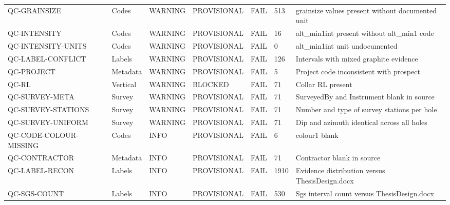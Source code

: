 \begin{table}[htbp]
\begin{tabular}{lllllll}
QC-GRAINSIZE & Codes & WARNING & PROVISIONAL & FAIL & 513 & grainsize values present without documented unit \\
QC-INTENSITY & Codes & WARNING & PROVISIONAL & FAIL & 16 & alt\_min1int present without alt\_min1 code \\
QC-INTENSITY-UNITS & Codes & WARNING & PROVISIONAL & FAIL & 0 & alt\_min1int unit undocumented \\
QC-LABEL-CONFLICT & Labels & WARNING & PROVISIONAL & FAIL & 126 & Intervals with mixed graphite evidence \\
QC-PROJECT & Metadata & WARNING & PROVISIONAL & FAIL & 5 & Project code inconsistent with prospect \\
QC-RL & Vertical & WARNING & BLOCKED & FAIL & 71 & Collar RL present \\
QC-SURVEY-META & Survey & WARNING & PROVISIONAL & FAIL & 71 & SurveyedBy and Instrument blank in source \\
QC-SURVEY-STATIONS & Survey & WARNING & PROVISIONAL & FAIL & 71 & Number and type of survey stations per hole \\
QC-SURVEY-UNIFORM & Survey & WARNING & PROVISIONAL & FAIL & 71 & Dip and azimuth identical across all holes \\
QC-CODE-COLOUR-MISSING & Codes & INFO & PROVISIONAL & FAIL & 6 & colour1 blank \\
QC-CONTRACTOR & Metadata & INFO & PROVISIONAL & FAIL & 71 & Contractor blank in source \\
QC-LABEL-RECON & Labels & INFO & PROVISIONAL & FAIL & 1910 & Evidence distribution versus ThesisDesign.docx \\
QC-SGS-COUNT & Labels & INFO & PROVISIONAL & FAIL & 530 & Sgs interval count versus ThesisDesign.docx \\
\bottomrule
\end{tabular}
\end{table}
